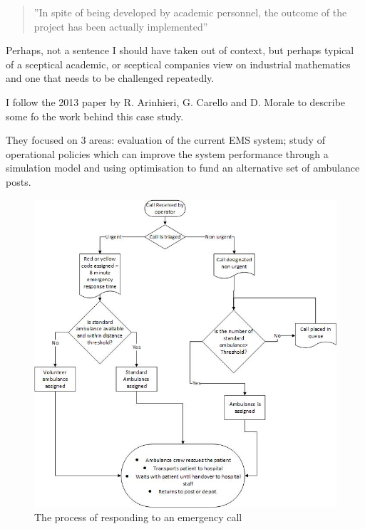 \documentclass[11pt]{article} %
\begin{document}
	\begin{quote}
		''In spite of being developed by academic personnel, the outcome of the project has been actually implemented''
	\end{quote}

	Perhaps, not a sentence I should have taken out of context, but perhaps typical of a sceptical academic, or sceptical companies view on industrial mathematics and one that needs to be challenged repeatedly. 
	
	

	I follow the 2013 paper by R. Arinhieri, G. Carello and D. Morale \cite{Carello2013}  to describe some fo the work behind this case study.
	
	They focused on 3 areas: evaluation of the current EMS system; study of operational policies which can improve the system performance through a simulation model and using optimisation to fund an alternative set of ambulance posts. 
	\begin{figure}
		\centering
		\includegraphics[width=\linewidth]{Report_images/MilanEMS}
		\caption{The process of responding to an emergency call}
		\label{fig:milanems}
	\end{figure}
\end{document}
